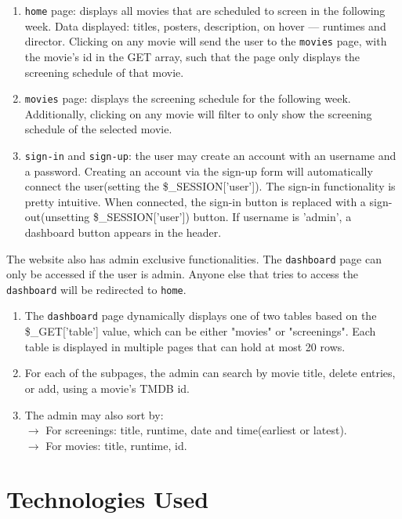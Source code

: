 \documentclass[a4paper]{article}
\begin{document}
\begin{enumerate}[label=$-$]
    \item\texttt{home} page: displays all movies that are scheduled to screen in the following week. Data displayed: titles, posters, description, on hover --- runtimes and director. Clicking on any movie will send the user to the \texttt{movies} page, with the movie's id in the GET array, such that the page only displays the screening schedule of that movie.

    \item\texttt{movies} page: displays the screening schedule for the following week. Additionally, clicking on any movie will filter to only show the screening schedule of the selected movie.

    \item\texttt{sign-in} and \texttt{sign-up}: the user may create an account with an username and a password. Creating an account via the sign-up form will automatically connect the user(setting the \$\_SESSION['user']). The sign-in functionality is pretty intuitive. When connected, the sign-in button is replaced with a sign-out(unsetting \$\_SESSION['user']) button. If username is 'admin', a dashboard button appears in the header.
\end{enumerate}

The website also has admin exclusive functionalities. The \texttt{dashboard} page can only be accessed if the user is admin. Anyone else that tries to access the \texttt{dashboard} will be redirected to \texttt{home}.

\begin{enumerate}[label=$-$]
    \item The \texttt{dashboard} page dynamically displays one of two tables based on the \$\_GET['table'] value, which can be either "movies" or "screenings". Each table is displayed in multiple pages that can hold at most 20 rows.
    \item For each of the subpages, the admin can search by movie title, delete entries, or add, using a movie's TMDB id.
    
    \item The admin may also sort by:\\$\rightarrow$ For screenings: title, runtime, date and time(earliest or latest).\\$\rightarrow$ For movies: title, runtime, id.
\end{enumerate}

\section{Technologies Used}
\end{document}
